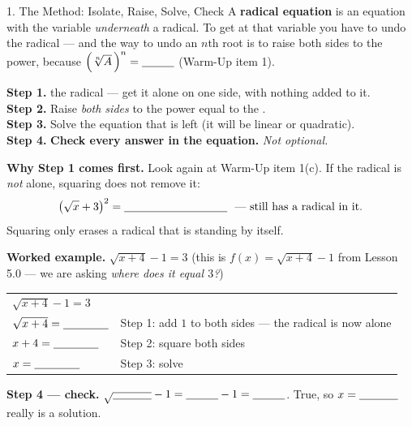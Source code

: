 \documentclass[10pt]{article}
\begin{document}
\begin{notesbox}{1. The Method: Isolate, Raise, Solve, Check}
A \textbf{radical equation} is an equation with the variable \emph{underneath} a radical. To get at
that variable you have to undo the radical --- and the way to undo an $n$th root is to raise both
sides to the \blank{1.6cm} power, because $\left(\sqrt[n]{A}\,\right)^{n}=\blank{1.0cm}$
(Warm-Up item 1).
\begin{center}
\begin{tcolorbox}[colback=goldbg, colframe=goldacc, boxrule=0.8pt, arc=1.5mm, width=0.94\linewidth,
    left=3mm, right=3mm, top=2mm, bottom=2mm]
\small
\textbf{Step 1.} \blank{3.2cm} the radical --- get it alone on one side, with nothing added to it.\\[3pt]
\textbf{Step 2.} Raise \emph{both sides} to the power equal to the \blank{1.6cm}.\\[3pt]
\textbf{Step 3.} Solve the equation that is left (it will be linear or quadratic).\\[3pt]
\textbf{Step 4.} \textbf{Check every answer in the \blank{2.6cm} equation.} \emph{Not optional.}
\end{tcolorbox}
\end{center}

\vspace{3pt}
\textbf{Why Step 1 comes first.} Look again at Warm-Up item 1(c). If the radical is \emph{not}
alone, squaring does not remove it:
\[
  \left(\sqrt{x}+3\right)^{2}=\blank{3.2cm}\ \ \text{--- still has a radical in it.}
\]
Squaring only erases a radical that is standing by itself.

\vspace{4pt}
\textbf{Worked example.} $\sqrt{x+4}-1=3$ \quad (this is $f(x)=\sqrt{x+4}-1$ from Lesson 5.0 --- we
are asking \emph{where does it equal $3$?})
\begin{center}
\renewcommand{\arraystretch}{1.7}
\begin{tabular}{@{}l l@{}}
$\sqrt{x+4}-1=3$ & \\
$\sqrt{x+4}=\blank{1.4cm}$ & Step 1: add $1$ to both sides --- the radical is now alone \\
$x+4=\blank{1.4cm}$ & Step 2: square both sides \\
$x=\blank{1.4cm}$ & Step 3: solve \\
\end{tabular}
\end{center}
\textbf{Step 4 --- check.} \; $\sqrt{\blank{1.2cm}}-1=\blank{1.0cm}-1=\blank{1.0cm}$. \;
True, so $x=\blank{1.2cm}$ really is a solution. \; \checkmark
\end{notesbox}
\end{document}
